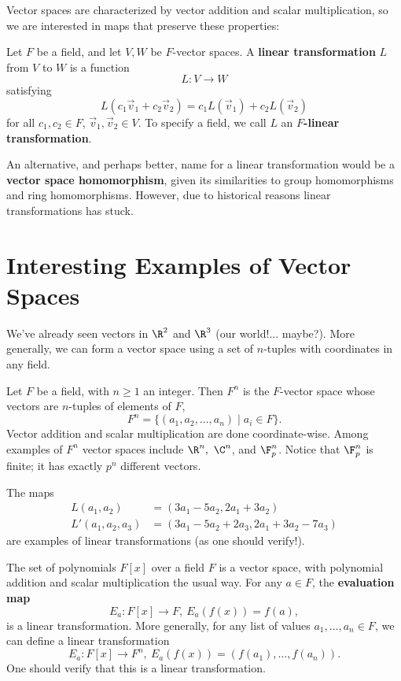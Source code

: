 \documentclass[math1530-lecture-notes]{subfiles}
\begin{document}
Vector spaces are characterized by vector addition and scalar multiplication, so we are interested
in maps that preserve these properties:
\begin{definition}{}
  Let $F$ be a field, and let $V,W$ be $F$-vector spaces. A \textbf{linear transformation} $L$ from
  $V$ to $W$ is a function \[
    L:V\longrightarrow W
  \] satisfying \[
    L(c_1\vec{v}_1+c_2\vec{v}_2)=c_1L(\vec{v}_1)+c_2L(\vec{v}_2)
  \] for all $c_1,c_2\in F$, $\vec{v}_1,\vec{v}_2\in V$. To specify a field, we call $L$ an
  \textbf{$F$-linear transformation}.
\end{definition}

\begin{remark}
  An alternative, and perhaps better, name for a linear transformation would be a \textbf{vector
  space homomorphism}, given its similarities to group homomorphisms and ring homomorphisms.
  However, due to historical reasons linear transformations has stuck.
\end{remark}


\section{Interesting Examples of Vector Spaces}

We've already seen vectors in $\R^2$ and $\R^3$ (our world!... maybe?). More generally, we can form
a vector space using a set of $n$-tuples with coordinates in any field.
\begin{example}
  Let $F$ be a field, with $n\ge 1$ an integer. Then $F^n$ is the $F$-vector space whose vectors are
  $n$-tuples of elements of $F$, \[
    F^n=\{(a_1,a_2,\ldots,a_n)\mid a_i\in F\} 
  .\] Vector addition and scalar multiplication are done coordinate-wise. Among examples of $F^n$
  vector spaces include $\R^n,\ \C^n$, and $\F_p^n$. Notice that $\F_p^n$ is finite; it has exactly
  $p^n$ different vectors.
\end{example}

\begin{example}
  The maps
  \begin{align*}
    L(a_1,a_2)&=(3a_1-5a_2,2a_1+3a_2)\\
    L'(a_1,a_2,a_3)&=(3a_1-5a_2+2a_3,2a_1+3a_2-7a_3)
  \end{align*} are examples of linear transformations (as one should verify!).
\end{example}

\begin{example}
  The set of polynomials $F[x]$ over a field $F$ is a vector space, with polynomial addition and
  scalar multiplication the usual way. For any $a\in F$, the \textbf{evaluation map} \[
    E_a: F[x]\longrightarrow F,\ E_a(f(x))=f(a)
  ,\] is a linear transformation. More generally, for any list of values $a_1,\ldots,a_n\in F$, we
  can define a linear transformation \[
    E_a: F[x] \longrightarrow F^n,\ E_a(f(x))=\left( f(a_1),\ldots,f(a_n) \right) 
  .\] One should verify that this is a linear transformation.
\end{example}
\end{document}
